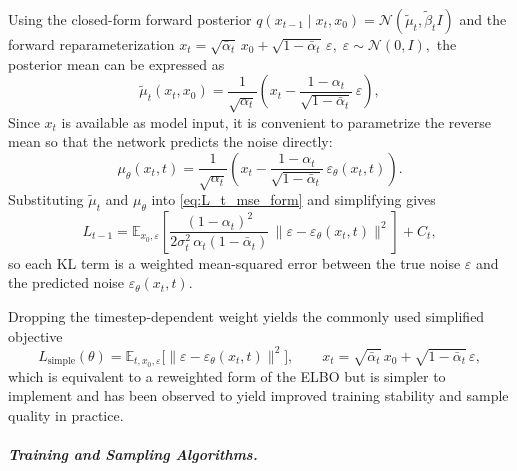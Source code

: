 Using the closed-form forward posterior
\(
    q(x_{t-1}\mid x_t,x_0)
    =
    \mathcal{N}(\tilde{\mu}_t,\tilde{\beta}_t I)
\)
and the forward reparameterization
\(
    x_t = \sqrt{\bar{\alpha}_t}\,x_0 +
    \sqrt{1-\bar{\alpha}_t}\,\varepsilon,\;
    \varepsilon\sim\mathcal{N}(0,I),
\)
the posterior mean can be expressed as
\begin{equation}
    \tilde{\mu}_t(x_t,x_0)
    =
    \frac{1}{\sqrt{\alpha_t}}
    \left(
        x_t
        -
        \frac{1-\alpha_t}{\sqrt{1-\bar{\alpha}_t}}\,
        \varepsilon
    \right),
\end{equation}
Since \(x_t\) is available as model
input, it is convenient to parametrize the reverse mean so that the network predicts the noise
directly:
\begin{equation}
    \mu_\theta(x_t,t)
    =
    \frac{1}{\sqrt{\alpha_t}}
    \left(
        x_t
        -
        \frac{1-\alpha_t}{\sqrt{1-\bar{\alpha}_t}}\,
        \varepsilon_\theta(x_t,t)
    \right).
    \label{eq:reverse_mean_eps_param}
\end{equation}
Substituting \(\tilde{\mu}_t\) and \(\mu_\theta\) into
\eqref{eq:L_t_mse_form} and simplifying gives
\begin{equation}
    L_{t-1}
    =
    \mathbb{E}_{x_0,\varepsilon}
    \left[
        \frac{(1-\alpha_t)^2}{2\sigma_t^2\,\alpha_t(1-\bar{\alpha}_t)}
        \,
        \bigl\|
            \varepsilon
            -
            \varepsilon_\theta(x_t,t)
        \bigr\|^2
    \right]
    + C_t,
\end{equation}
so each KL term is a weighted mean-squared error between the true noise
\(\varepsilon\) and the predicted noise \(\varepsilon_\theta(x_t,t)\).

Dropping the timestep-dependent weight yields the commonly used simplified objective
\begin{equation}
    L_{\mathrm{simple}}(\theta)
    =
    \mathbb{E}_{t,x_0,\varepsilon}
    \bigl[
        \|
            \varepsilon
            -
            \varepsilon_\theta(x_t,t)
        \|^2
    \bigr],
    \qquad
    x_t
    =
    \sqrt{\bar{\alpha}_t}\,x_0
    +
    \sqrt{1-\bar{\alpha}_t}\,\varepsilon,
    \label{eq:ddpm_simple_loss}
\end{equation}
which is equivalent to a reweighted form of the ELBO but is simpler to implement and has been
observed to yield improved training stability and sample quality in practice.

\subparagraph{Training and Sampling Algorithms.}

